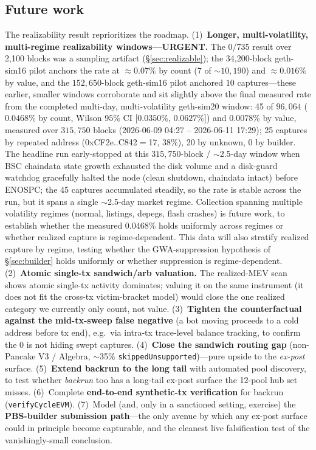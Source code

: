 \documentclass[11pt]{article}
\newcommand{\code}[1]{\texttt{#1}}
\begin{document}
\subsection{Future work}\label{sec:future}
The realizability result reprioritizes the roadmap. (1)~\textbf{Longer,
multi-volatility, multi-regime realizability windows---URGENT.} The 0/735 result over
2{,}100 blocks was a sampling artifact (\S\ref{sec:realizable}); the 34{,}200-block
geth-sim16 pilot anchors the rate at $\approx$$0.07\%$ by count ($7$ of
$\sim$$10{,}190$) and $\approx$$0.016\%$ by value, and the $152{,}650$-block geth-sim16
pilot anchored $10$ captures---these earlier, smaller windows corroborate and sit slightly above the final
measured rate from the completed multi-day, multi-volatility geth-sim20 window:
45 of $96{,}064$ ($0.0468\%$ by count, Wilson $95\%$ CI [$0.0350\%$, $0.0627\%$]) and
$0.0078\%$ by value, measured over $315{,}750$ blocks (2026-06-09 04:27 -- 2026-06-11
17:29); 25 captures by repeated address (0xCF2e..C842$=$17, $38\%$), 20 by unknown, 0 by
builder. The headline run early-stopped at this $315{,}750$-block / $\sim$2.5-day window
when BSC chaindata state growth exhausted the disk volume and a disk-guard watchdog
gracefully halted the node (clean shutdown, chaindata intact) before ENOSPC; the 45
captures accumulated steadily, so the rate is stable across the run, but it spans a
single $\sim$2.5-day market regime. Collection spanning multiple volatility regimes (normal,
listings, depegs, flash crashes) is future work, to establish whether the measured
$0.0468\%$ holds uniformly across regimes or whether realized capture is regime-dependent.
This data will also stratify realized capture by regime, testing whether the
GWA-suppression hypothesis of \S\ref{sec:builder} holds uniformly or whether
suppression is regime-dependent.
(2)~\textbf{Atomic single-tx sandwich/arb valuation.} The realized-MEV scan shows
atomic single-tx activity dominates; valuing it on the same instrument (it does not fit
the cross-tx victim-bracket model) would close the one realized category we currently
only count, not value. (3)~\textbf{Tighten the counterfactual against the mid-tx-sweep
false negative} (a bot moving proceeds to a cold address before tx end), e.g.\ via
intra-tx trace-level balance tracking, to confirm the 0 is not hiding swept captures.
(4)~\textbf{Close the sandwich routing gap} (non-Pancake V3 / Algebra, $\sim$35\%
\code{skippedUnsupported})---pure upside to the \emph{ex-post} surface. (5)~\textbf{Extend
backrun to the long tail} with automated pool discovery, to test whether \emph{backrun}
too has a long-tail ex-post surface the 12-pool hub set misses. (6)~Complete
\textbf{end-to-end synthetic-tx verification} for backrun (\code{verifyCycleEVM}).
(7)~Model (and, only in a sanctioned setting, exercise) the \textbf{PBS-builder
submission path}---the only avenue by which any ex-post surface could in principle
become capturable, and the cleanest live falsification test of the vanishingly-small
conclusion.
\end{document}
